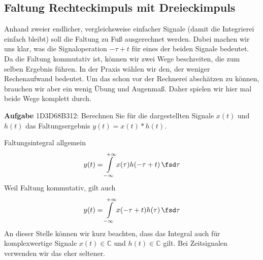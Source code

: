 \newpage
\subsection{Faltung Rechteckimpuls mit Dreieckimpuls}
\label{sec:1D3D68B312}
\begin{Ziel}
Anhand zweier endlicher, vergleichsweise einfacher Signale (damit die Integrierei
einfach bleibt) soll die Faltung zu Fuß ausgerechnet werden.
Dabei machen wir uns klar, was die Signaloperation $-\tau+t$ für eines der beiden
Signale bedeutet.
Da die Faltung kommutativ ist, können wir zwei Wege beschreiten, die zum selben
Ergebnis führen. In der Praxis wählen wir den, der weniger Rechenaufwand bedeutet.
Um das schon vor der Rechnerei abschätzen zu können, brauchen wir aber ein wenig
Übung und Augenmaß. Daher spielen wir hier mal beide Wege komplett durch.
\end{Ziel}
%
\textbf{Aufgabe} {\tiny 1D3D68B312}: Berechnen Sie für die dargestellten Signale
$x(t)$ und $h(t)$ das Faltungsergebnis $y(t) = x(t) \ast h(t)$.
%
\begin{center}
\end{center}

\begin{Werkzeug}
Faltungsintegral allgemein
\begin{equation}
y(t) = \int\limits_{-\infty}^{+\infty} x(\tau) h(-\tau + t) \, \fsd \tau
\end{equation}
Weil Faltung kommutativ, gilt auch
\begin{equation}
y(t) = \int\limits_{-\infty}^{+\infty} x(-\tau+t) h(\tau) \, \fsd \tau
\end{equation}
An dieser Stelle können wir kurz beachten, dass das Integral auch für
komplexwertige Signale $x(t)\in\mathbb{C}$ und $h(t)\in\mathbb{C}$ gilt. Bei
Zeitsignalen verwenden wir das eher seltener.
\end{Werkzeug}

